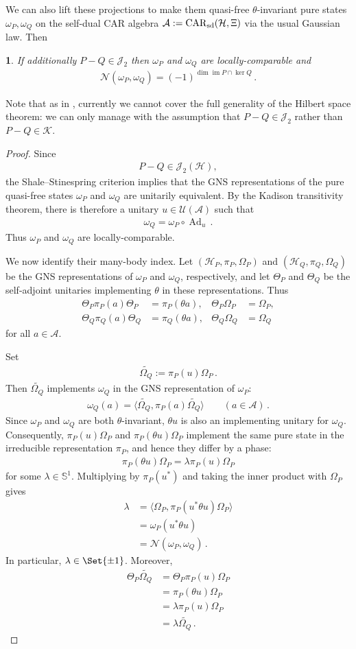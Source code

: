 \documentclass[a4paper,10pt]{article}
\numberwithin{equation}{section}
\theoremstyle{plain}
\newtheorem{thm}{\protect\theoremname}[section]
\theoremstyle{plain}
\theoremstyle{plain}
\theoremstyle{plain}
\theoremstyle{plain}
\theoremstyle{remark}
\theoremstyle{definition}
\providecommand{\theoremname}{Theorem}
\newcommand{\calA}{\mathcal{A}}
\newcommand{\calN}{\mathcal{N}}
\newcommand{\calU}{\mathcal{U}}
\newcommand{\calH}{\mathcal{H}}
\newcommand{\calK}{\mathcal{K}}
\newcommand{\calJ}{\mathcal{J}}
\newcommand{\ip}[2]{\langle #1, #2 \rangle}
\newcommand{\Ad}[1]{\operatorname{Ad}_{#1}}
\newcommand{\im}{\operatorname{im}}
\newcommand{\eq}[1]{\begin{align*}#1\end{align*}}
\newcommand{\eql}[1]{\begin{align}#1\end{align}}
\newcommand{\br}[1]{\left(#1\right)}
\begin{document}
We can also lift these projections to make them quasi-free $\theta$-invariant pure states $\omega_P,\omega_Q$ on the self-dual CAR algebra $\calA := \operatorname{CAR}_{\rm sd}(\calH,\Xi)$ \cite{Araki1970QuasifreeCAR} via the usual Gaussian law. Then 
\begin{thm}\label{thm:Hilbert-space CAR correspondence}
    If additionally $P-Q\in \calJ_2$ then $\omega_P$ and $\omega_Q$ are locally-comparable and 
    \eql{
    \calN(\omega_P,\omega_Q) = \br{-1}^{\dim \im P \cap\ker Q}\,.
    }
\end{thm}
Note that as in \cite{BachmannShapiroTauber2026}, currently we cannot cover the full generality of the Hilbert space theorem: we can only manage with the assumption that $P-Q\in\calJ_2$ rather than $P-Q\in\calK$.
\begin{proof}
Since
\eq{
    P-Q\in\calJ_2(\calH),
}
the Shale--Stinespring criterion implies that the GNS representations
of the pure quasi-free states $\omega_P$ and $\omega_Q$ are unitarily
equivalent. By the Kadison transitivity theorem, there is therefore a
unitary $u\in\calU(\calA)$ such that
\eql{
    \omega_Q=\omega_P\circ\Ad{u}\,.
}
Thus $\omega_P$ and $\omega_Q$ are locally-comparable.

We now identify their many-body index. Let
$(\calH_P,\pi_P,\Omega_P)$ and $(\calH_Q,\pi_Q,\Omega_Q)$ be the GNS
representations of $\omega_P$ and $\omega_Q$, respectively, and let
$\Theta_P$ and $\Theta_Q$ be the self-adjoint unitaries implementing
$\theta$ in these representations. Thus
\eq{
    \Theta_P\pi_P(a)\Theta_P&=\pi_P(\theta a),&
    \Theta_P\Omega_P&=\Omega_P,\\
    \Theta_Q\pi_Q(a)\Theta_Q&=\pi_Q(\theta a),&
    \Theta_Q\Omega_Q&=\Omega_Q
}
for all $a\in\calA$.

Set
\eql{
    \widetilde{\Omega_Q}:=\pi_P(u)\Omega_P\,.
}
Then $\widetilde{\Omega_Q}$ implements $\omega_Q$ in the GNS
representation of $\omega_P$:
\eql{
    \omega_Q(a)
    =
    \ip{\widetilde{\Omega_Q}}
        {\pi_P(a)\widetilde{\Omega_Q}}
    \qquad(a\in\calA)\,.
}
Since $\omega_P$ and $\omega_Q$ are both $\theta$-invariant, $\theta u$
is also an implementing unitary for $\omega_Q$. Consequently,
$\pi_P(u)\Omega_P$ and $\pi_P(\theta u)\Omega_P$ implement the same
pure state in the irreducible representation $\pi_P$, and hence they
differ by a phase:
\eql{
    \pi_P(\theta u)\Omega_P
    =
    \lambda\pi_P(u)\Omega_P
}
for some $\lambda\in\mathbb{S}^1$. Multiplying by $\pi_P(u^\ast)$ and
taking the inner product with $\Omega_P$ gives
\eq{
    \lambda
    &=
    \ip{\Omega_P}{\pi_P(u^\ast\theta u)\Omega_P}\\
    &=
    \omega_P(u^\ast\theta u)\\
    &=
    \calN(\omega_P,\omega_Q)\,.
}
In particular, $\lambda\in\Set{\pm1}$. Moreover,
\eq{
    \Theta_P\widetilde{\Omega_Q}
    &=
    \Theta_P\pi_P(u)\Omega_P\\
    &=
    \pi_P(\theta u)\Omega_P\\
    &=
    \lambda\pi_P(u)\Omega_P\\
    &=
    \lambda\widetilde{\Omega_Q}\,.
}


\end{proof}
\end{document}
